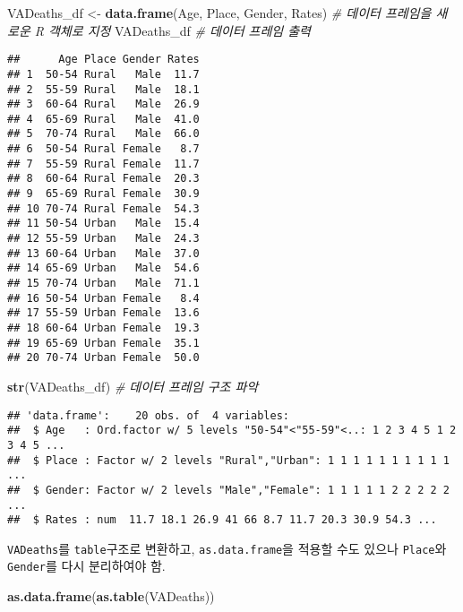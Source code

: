 \documentclass[
]{article}
\newenvironment{Shaded}{\begin{snugshade}}{\end{snugshade}}
\newcommand{\CommentTok}[1]{\textcolor[rgb]{0.56,0.35,0.01}{\textit{#1}}}
\newcommand{\KeywordTok}[1]{\textcolor[rgb]{0.13,0.29,0.53}{\textbf{#1}}}
\newcommand{\NormalTok}[1]{#1}
\newcommand{\StringTok}[1]{\textcolor[rgb]{0.31,0.60,0.02}{#1}}
\begin{document}
\begin{Shaded}
\begin{Highlighting}[]
\NormalTok{VADeaths_df <-}\StringTok{ }\KeywordTok{data.frame}\NormalTok{(Age, Place, Gender, Rates) }\CommentTok{# 데이터 프레임을 새로운 R 객체로 지정 }
\NormalTok{VADeaths_df }\CommentTok{# 데이터 프레임 출력 }
\end{Highlighting}
\end{Shaded}

\begin{verbatim}
##      Age Place Gender Rates
## 1  50-54 Rural   Male  11.7
## 2  55-59 Rural   Male  18.1
## 3  60-64 Rural   Male  26.9
## 4  65-69 Rural   Male  41.0
## 5  70-74 Rural   Male  66.0
## 6  50-54 Rural Female   8.7
## 7  55-59 Rural Female  11.7
## 8  60-64 Rural Female  20.3
## 9  65-69 Rural Female  30.9
## 10 70-74 Rural Female  54.3
## 11 50-54 Urban   Male  15.4
## 12 55-59 Urban   Male  24.3
## 13 60-64 Urban   Male  37.0
## 14 65-69 Urban   Male  54.6
## 15 70-74 Urban   Male  71.1
## 16 50-54 Urban Female   8.4
## 17 55-59 Urban Female  13.6
## 18 60-64 Urban Female  19.3
## 19 65-69 Urban Female  35.1
## 20 70-74 Urban Female  50.0
\end{verbatim}

\begin{Shaded}
\begin{Highlighting}[]
\KeywordTok{str}\NormalTok{(VADeaths_df) }\CommentTok{# 데이터 프레임 구조 파악}
\end{Highlighting}
\end{Shaded}

\begin{verbatim}
## 'data.frame':    20 obs. of  4 variables:
##  $ Age   : Ord.factor w/ 5 levels "50-54"<"55-59"<..: 1 2 3 4 5 1 2 3 4 5 ...
##  $ Place : Factor w/ 2 levels "Rural","Urban": 1 1 1 1 1 1 1 1 1 1 ...
##  $ Gender: Factor w/ 2 levels "Male","Female": 1 1 1 1 1 2 2 2 2 2 ...
##  $ Rates : num  11.7 18.1 26.9 41 66 8.7 11.7 20.3 30.9 54.3 ...
\end{verbatim}

\texttt{VADeaths}를 \texttt{table}구조로 변환하고,
\texttt{as.data.frame}을 적용할 수도 있으나 \texttt{Place}와
\texttt{Gender}를 다시 분리하여야 함.

\begin{Shaded}
\begin{Highlighting}[]
\KeywordTok{as.data.frame}\NormalTok{(}\KeywordTok{as.table}\NormalTok{(VADeaths))}
\end{Highlighting}
\end{Shaded}
\end{document}

